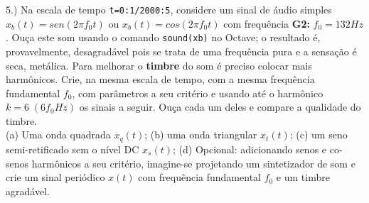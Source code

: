 \documentclass{article}
\begin{document}
5.) Na escala de tempo {\tt t=0:1/2000:5}, considere um sinal de áudio simples $x_{b}(t) = sen(2 \pi f_{0}t)$ ou $x_{b}(t) = cos(2 \pi f_{0}t)$ com frequência \textbf{G2:} $f_{0} = 132Hz$. Ouça este som usando o comando {\tt sound(xb)} no Octave; o resultado é, provavelmente, desagradável pois se trata de uma frequência pura e a sensação é seca, metálica. Para melhorar o \textbf{timbre} do som é preciso colocar mais harmônicos. Crie, na mesma escala de tempo, com a mesma frequência fundamental $f_{0}$, com parâmetros a seu critério e usando até o harmônico $k = 6\;(6f_{0}Hz)$ os sinais a seguir. Ouça cada um deles e compare a qualidade do timbre.\\
(a) Uma onda quadrada $x_{q}(t)$;
(b) uma onda triangular $x_{t}(t)$;
(c) um seno semi-retificado sem o nível DC $x_{s}(t)$;
(d) Opcional: adicionando senos e co-senos harmônicos a seu critério, imagine-se projetando um sintetizador de som e crie um sinal periódico $x(t)$ com frequência fundamental $f_{0}$ e um timbre agradável.
\end{document}
